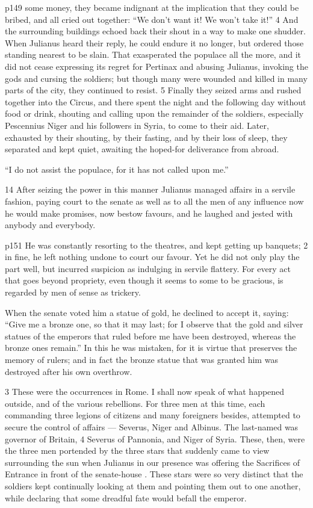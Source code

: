p149 some money, they became indignant at the implication that they could be bribed, and all cried out together: ``We don't want it! We won't take it!'' 4 And the surrounding buildings echoed back their shout in a way to make one shudder. When Julianus heard their reply, he could endure it no longer, but ordered those standing nearest to be slain. That exasperated the populace all the more, and it did not cease expressing its regret for Pertinax and abusing Julianus, invoking the gods and cursing the soldiers; but though many were wounded and killed in many parts of the city, they continued to resist. 5 Finally they seized arms and rushed together into the Circus, and there spent the night and the following day without food or drink, shouting and calling upon the remainder of the soldiers, especially Pescennius Niger and his followers in Syria, to come to their aid. Later, exhausted by their shouting, by their fasting, and by their loss of sleep, they separated and kept quiet, awaiting the hoped-for deliverance from abroad.

``I do not assist the populace, for it has not called upon me.''

14
After seizing the power in this manner Julianus managed affairs in a servile fashion, paying court to the senate as well as to all the men of any influence now he would make promises, now bestow favours, and he laughed and jested with anybody and everybody.

p151 He was constantly resorting to the theatres, and kept getting up banquets; 2 in fine, he left nothing undone to court our favour. Yet he did not only play the part well, but incurred suspicion as indulging in servile flattery. For every act that goes beyond propriety, even though it seems to some to be gracious, is regarded by men of sense as trickery.

When the senate voted him a statue of gold, he declined to accept it, saying: ``Give me a bronze one, so that it may last; for I observe that the gold and silver statues of the emperors that ruled before me have been destroyed, whereas the bronze ones remain.'' In this he was mistaken, for it is virtue that preserves the memory of rulers; and in fact the bronze statue that was granted him was destroyed after his own overthrow.

3
These were the occurrences in Rome. I shall now speak of what happened outside, and of the various rebellions. For three men at this time, each commanding three legions of citizens and many foreigners besides, attempted to secure the control of affairs \texthebrew{—} Severus, Niger and Albinus. The last-named was governor of Britain, 4 Severus of Pannonia, and Niger of Syria. These, then, were the three men portended by the three stars that suddenly came to view surrounding the sun when Julianus in our presence was offering the Sacrifices of Entrance in front of the senate-house . These stars were so very distinct that the soldiers kept continually looking at them and pointing them out to one another, while declaring that some dreadful fate would befall the emperor.

